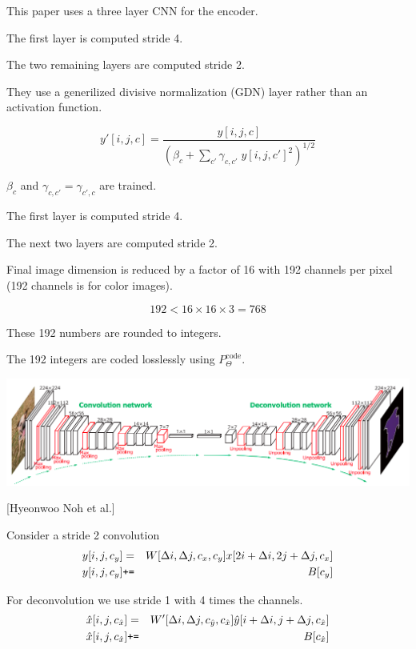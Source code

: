 {

This paper uses a three layer CNN for the encoder.

\vfill
The first layer is computed stride 4.

\vfill
The two remaining layers are computed stride 2.

\vfill
They use a generilized divisive normalization (GDN) layer rather than an activation function. 

$$y'[i,j,c] = \frac{y[i,j,c]}{\left(\beta_c + \sum_{c'} \gamma_{c,c'}\; y[i,j,c']^2 \right)^{1/2}}$$

\vfill
$\beta_c$ and $\gamma_{c,c'} = \gamma_{c',c}$ are trained.


\vfill
The first layer is computed stride 4.

\vfill
The next two layers are computed stride 2.

\vfill
Final image dimension is reduced by a factor of 16 with 192 channels per pixel (192 channels is for color images).

\vfill
$$192 < 16 \times 16 \times 3 = 768$$

\vfill
These 192 numbers are rounded to integers.

\vfill
The 192 integers are coded losslessly using $P^{\mathrm{code}}_\Theta$.


\centerline{\includegraphics[width=9in]{../images/Deconv}}
\centerline{[Hyeonwoo Noh et al.]}


Consider a stride 2 convolution
\begin{eqnarray*}
  y[i,j,c_y] & = &   W[\Delta i, \Delta j, c_x, c_y] x[2i + \Delta i, 2j + \Delta j, c_x] \\
  y[i,j,c_y] & \mbox{\tt +=} & B[c_y]
\end{eqnarray*}

\vfill
For deconvolution we use stride 1 with 4 times the channels.
\begin{eqnarray*}
  \hat{x}[i,j,c_{\hat{x}}] & = &   W'[\Delta i, \Delta j, c_{\hat{y}}, c_{\hat{x}}] \hat{y}[i + \Delta i, j + \Delta j, c_{\hat{x}}] \\
  \hat{x}[i,j,c_{\hat{x}}] & \mbox{\tt +=} & B[c_{\hat{x}}]
\end{eqnarray*}

}
